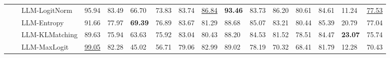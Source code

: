 \begin{table}[ht!]
\begin{tabularx}{\textwidth}{@{}l l l |l *{11}{Y}|Y@{}}
 &  & LLM-LogitNorm & 95.94 & 83.49 & 66.70 & 73.83 & 83.74 & \underline{86.84} & \textbf{93.46} & 83.73 & 86.20 & 80.61 & 84.61 & 11.24 & \underline{77.53} \\
 &  & LLM-Entropy & 91.66 & 77.97 & \textbf{69.39} & 76.89 & 83.67 & 81.29 & 88.68 & 85.07 & 83.21 & 80.44 & 85.39 & 20.79 & 77.04 \\
 &  & LLM-KLMatching & 89.63 & 75.94 & 63.63 & 75.92 & 83.04 & 80.43 & 88.20 & 84.53 & 81.52 & 78.51 & 84.47 & \textbf{23.07} & 75.74 \\
 &  & LLM-MaxLogit & \underline{99.05} & 82.28 & 45.02 & 56.71 & 79.06 & 82.99 & 89.02 & 78.19 & 70.32 & 68.41 & 81.79 & 12.28 & 70.43 \\
\bottomrule
\end{tabularx}
\label{table::openset_LCR1}
\end{table}